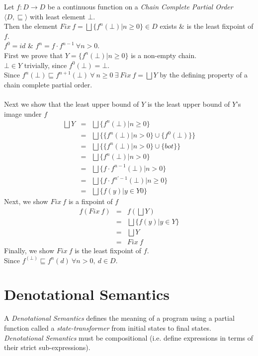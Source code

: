 \documentclass[11pt,a4paper]{article}
\begin{document}
Let $f:D\to D$ be a continuous function on a \textit{Chain Complete Partial Order} $\langle D,\sqsubseteq\rangle$ with least element $\bot$.\\
Then the element $Fix\ f=\bigsqcup\{f^n(\bot)|n\geq0\}\in D$ exists \& is the least fixpoint of $f$.\\
\nb $f^0=id$ \& $f^n=f\cdot f^{n-1}\ \forall n>0$.\\

First we prove that $Y=\{f^n(\bot)|n\geq0\}$ is a non-empty chain.\\
$\bot\in Y$ trivially, since $f^0(\bot)=\bot$.\\
Since $f^n(\bot)\sqsubseteq f^{n+1}(\bot)\ \forall\ n\geq 0\ \exists\ Fix\ f=\bigsqcup Y$ by the defining property of a chain complete partial order.\\
\\
Next we show that the least upper bound of $Y$ is the least upper bound of $Y$'s image under $f$
\[\begin{array}{rcl}
\bigsqcup Y&=& \bigsqcup\{f^n(\bot)|n\geq0\}\\
&=&\bigsqcup\big\{\{f^n(\bot)|n>0\}\cup\{f^0(\bot)\}\big\}\\
&=&\bigsqcup\big\{\{f^n(\bot)|n>0\}\cup\{bot\}\big\}\\
&=&\bigsqcup\{f^n(\bot)|n>0\}\\
&=&\bigsqcup\{f\cdot f^{n-1}(\bot)|n>0\}\\
&=&\bigsqcup\{f\cdot f^{n'-1}(\bot)|n\geq0\}\\
&=&\bigsqcup\{f(y)|y\in Y0\}
\end{array}\]
Next, we show $Fix\ f$ is a fixpoint of $f$
\[\begin{array}{rcl}
f(Fix\ f)&=&f\left(\bigsqcup Y\right)\\
&=&\bigsqcup\{f(y)|y\in Y\}\\
&=&\bigsqcup Y\\
&=&Fix\ f
\end{array}\]
Finally, we show $Fix\ f$ is the least fixpoint of $f$.\\
Since $f^(\bot)\sqsubseteq f^n(d)\ \forall n>0,\ d\in D$.


\section{Denotational Semantics}

A \textit{Denotational Semantics} defines the meaning of a program using a partial function called a \textit{state-transformer} from initial states to final states.\\
\textit{Denotational Semantics} must be compositional (i.e. define expressions in terms of their strict sub-expressions).\\
\end{document}
